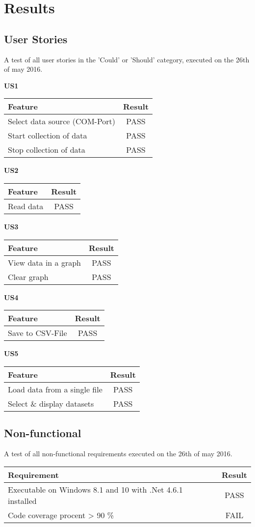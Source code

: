 \chapter{Results}

\section{User Stories}

A test of all user stories in the 'Could' or 'Should' category, executed on the 26th of may 2016.

\textbf{US1}

\begin{tabular}{p{7cm}c}
	\textbf{Feature} & \textbf{Result} \\ \hline
	Select data source (COM-Port) & PASS\\
	Start collection of data & PASS\\
	Stop collection of data & PASS\\
\end{tabular}

\textbf{US2}

\begin{tabular}{p{7cm}c}
	\textbf{Feature} & \textbf{Result} \\ \hline
	Read data & PASS\\
\end{tabular}

\textbf{US3}

\begin{tabular}{p{7cm}c}
	\textbf{Feature} & \textbf{Result} \\ \hline
	View data in a graph & PASS\\
	Clear graph & PASS\\
\end{tabular}

\textbf{US4}

\begin{tabular}{p{7cm}c}
	\textbf{Feature} & \textbf{Result} \\ \hline
	Save to CSV-File & PASS\\
\end{tabular}

\textbf{US5}

\begin{tabular}{p{7cm}c}
	\textbf{Feature} & \textbf{Result} \\ \hline
	Load data from a single file & PASS\\
	Select \& display datasets & PASS\\
\end{tabular}

\section{Non-functional}
A test of all non-functional requirements executed on the 26th of may 2016.

\begin{tabular}{p{7cm}c}
	\textbf{Requirement} & \textbf{Result} \\ \hline
	Executable on Windows 8.1 and 10 with .Net 4.6.1 installed & PASS\\
	Code coverage procent > 90 \% & FAIL\\
\end{tabular}